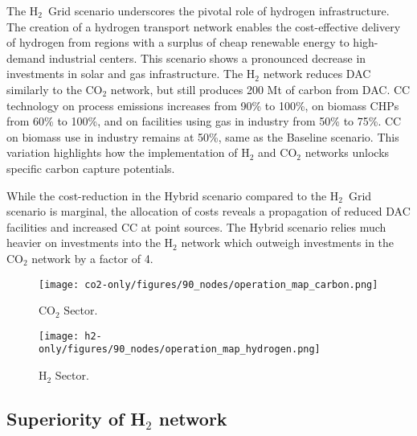 \documentclass[twocolumn]{article}
\newcommand{\carbon}{CO$_2$}
\newcommand{\hydrogen}{H$_2$}
\newcommand{\scbase}{Baseline scenario}
\begin{document}
The \hydrogen{}~Grid scenario underscores the pivotal role of hydrogen infrastructure. The creation of a hydrogen transport network enables the cost-effective delivery of hydrogen from regions with a surplus of cheap renewable energy to high-demand industrial centers. This scenario shows a pronounced decrease in investments in solar and gas  infrastructure. The \hydrogen{} network reduces DAC similarly to the \carbon{} network, but still produces 200 Mt of carbon from DAC. CC technology on process emissions increases from 90\% to 100\%, on biomass CHPs from 60\% to 100\%, and on facilities using gas in industry from 50\% to 75\%. CC on biomass use in industry remains at 50\%, same as the \scbase. This variation highlights how the implementation of \hydrogen{} and \carbon{} networks unlocks specific carbon capture potentials.

While the cost-reduction in the Hybrid scenario compared to the \hydrogen~Grid scenario is marginal, the allocation of costs reveals a propagation of reduced DAC facilities and increased CC at point sources. The Hybrid scenario relies much heavier on investments into the \hydrogen{} network which outweigh investments in the \carbon{} network by a factor of 4.


\begin{figure*}[h]
    \centering
    \begin{subfigure}{\linewidth}
        \centering
        \texttt{[image: co2-only/figures/90\_nodes/operation\_map\_carbon.png]}
        \caption{\carbon{} Sector.}
        \label{fig:operation_map_carbon}
    \end{subfigure}
    \begin{subfigure}{\linewidth}
        \centering
        \texttt{[image: h2-only/figures/90\_nodes/operation\_map\_hydrogen.png]}
        \caption{\hydrogen{} Sector.}
        \label{fig:operation_map_hydrogen}
    \end{subfigure}
    \caption{Optimal operation per sector for a net-zero energy system in Europe with average production on the left and average consumption on the right for both, (a) the \carbon{} sector in the \carbon{}-Grid model and (b) the \hydrogen{} sector in the \hydrogen-Grid model.}
    \label{fig:operation_map}
\end{figure*}


\subsection*{Superiority of \hydrogen{} network}
\end{document}
